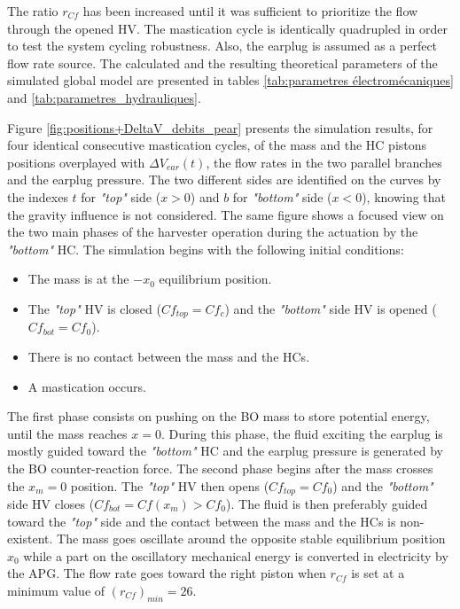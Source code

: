 \documentclass[3p,twocolumn,preprint]{elsarticle}
\begin{document}
The ratio $r_{Cf}$ has been increased until it was sufficient to prioritize the flow through the opened HV. The mastication cycle is identically quadrupled in order to test the system cycling robustness. Also, the earplug is assumed as a perfect flow rate source. The calculated and the resulting theoretical parameters of the simulated global model are presented in tables \ref{tab:parametres électromécaniques} and \ref{tab:parametres_hydrauliques}.

Figure \ref{fig:positions+DeltaV_debits_pear} presents the simulation results, for four identical consecutive mastication cycles, of the mass and the HC pistons positions overplayed with $\Delta V_{ear}(t)$, the flow rates in the two parallel branches and the earplug pressure. The two different sides are identified on the curves by the indexes $t$ for \emph{"top"} side ($x>0$) and $b$ for \emph{"bottom"} side ($x<0$), knowing that the gravity influence is not considered. The same figure shows a focused view on the two main phases of the harvester operation during the actuation by the \emph{"bottom"} HC. The simulation begins with the following initial conditions:
\begin{itemize}
	\item The mass is at the $-x_0$ equilibrium position.
	\item The \emph{"top"} HV is closed ($Cf_{top} = Cf_c$) and the \emph{"bottom"} side HV is opened ($Cf_{bot} = Cf_0$).
	\item There is no contact between the mass and the HCs.
	\item A mastication occurs.
\end{itemize}

The first phase consists on pushing on the BO mass to store potential energy, until the mass reaches $x=0$. During this phase, the fluid exciting the earplug is mostly guided toward the \emph{"bottom"} HC and the earplug pressure is generated by the BO counter-reaction force. The second phase begins after the mass crosses the $x_m=0$ position. The \emph{"top"} HV then opens ($Cf_{top} = Cf_0$) and the \emph{"bottom"} side HV closes ($Cf_{bot} = Cf(x_m)>Cf_0$). The fluid is then preferably guided toward the \emph{"top"} side and the contact between the mass and the HCs is non-existent. The mass goes oscillate around the opposite stable equilibrium position $x_0$ while a part on the oscillatory mechanical energy is converted in electricity by the APG. The flow rate goes toward the right piston when $r_{Cf}$ is set at a minimum value of \mbox{$(r_{Cf})_{min}=26$}. 
\end{document}
